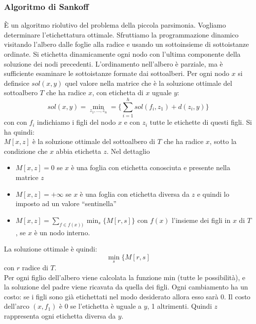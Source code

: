 \documentclass[a4paper,12pt, oneside]{book}
\begin{document}
\subsubsection{Algoritmo di Sankoff}
È un algoritmo riolutivo del problema della piccola
parsimonia. Vogliamo determinare l'etichettatura ottimale. Sfruttiamo
la programmazione dinamico visitando l'albero dalle foglie alla radice
e usando un sottoinsieme di sottoistanze ordinate. Si etichetta
dinamicamente ogni nodo con l'ultima componente della soluzione dei
nodi precedenti. L’ordinamento nell’albero è parziale, ma è
sufficiente esaminare le sottoistanze formate dai sottoalberi. Per
ogni nodo $x$ si definsice $sol(x,y)$ quel valore nella matrice che è
la soluzione ottimale del sottoalbero $T$ che ha radice $x$, con
etichetta di $x$ uguale $y$:
\[sol(x,y)=\min_{z_1,\ldots,z_n}=\{\sum_{i=1}^hsol(f_i,z_1)+d(z_i,y)\}\]
con con $f_i$ indichiamo i figli del nodo $x$ e con $z_i$ tutte le
etichette di questi figli. Si ha quindi:\\
$M[x,z]$ è la soluzione ottimale del sottoalbero di $T$ che ha
radice $x$, sotto la condizione che $x$ abbia etichetta $z$. Nel dettaglio
\begin{itemize}
  \item $M[x,z]=0$ se $x$ è una foglia con etichetta conosciuta e
  presente nella matrice $z$
  \item $M[x,z]=+\infty$ se $x$ è una foglia con etichetta diversa da
  $z$ e quindi lo imposto ad un valore ``sentinella''
  \item  $M[x,z]=\sum_{f\in f(x))}\min_s\{M[r,s]\}$ con $f(x)$
  l’insieme dei figli in $x$ di $T$, se $x$ è un nodo interno.
\end{itemize}
La soluzione ottimale è quindi:
\[\min_s\{M[r,s]\]
con $r$ radice di $T$.\\
Per ogni figlio dell’albero viene calcolata la funzione min (tutte le
possibilità), e la soluzione del padre viene ricavata da quella dei
figli. Ogni cambiamento ha un costo: se i figli sono già etichettati
nel modo desiderato allora esso sarà 0. Il costo dell’arco $(x, f_1
)$ è $0$ se l’etichetta è uguale a $y$, 1 altrimenti. Quindi $z$
rappresenta ogni etichetta diversa da $y$.
\end{document}

